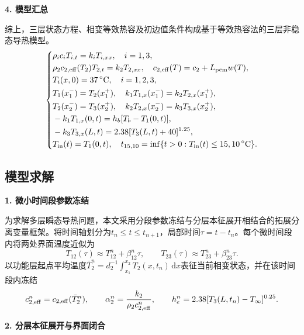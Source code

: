 \noindent\textbf{4. 模型汇总}\par
综上，三层状态方程、相变等效热容及初边值条件构成基于等效热容法的三层非稳态导热模型。
\vspace{-0.3\baselineskip}
{\boldmath
\begin{equation}
\left\{
\begin{aligned}
&\rho_i c_iT_{i,t}=k_iT_{i,xx},\quad i=1,3,\\
&\rho_2c_{2,\rm eff}(T_2)T_{2,t}=k_2T_{2,xx},\quad c_{2,\rm eff}(T)=c_2+L_{\rm pcm}w(T),\\
&T_i(x,0)=37\,^{\circ}\mathrm C,\quad i=1,2,3,\\
&T_1(x_1^-)=T_2(x_1^+),\quad k_1T_{1,x}(x_1^-)=k_2T_{2,x}(x_1^+),\\
&T_2(x_2^-)=T_3(x_2^+),\quad k_2T_{2,x}(x_2^-)=k_3T_{3,x}(x_2^+),\\
&-k_1T_{1,x}(0,t)=h_b[T_b-T_1(0,t)],\\
&-k_3T_{3,x}(L,t)=2.38[T_3(L,t)+40]^{1.25},\\
&T_{\rm in}(t)=T_1(0,t),\quad t_{15,10}=\inf\{t>0:T_{\rm in}(t)\le15,10\,^{\circ}\mathrm C\}.
\end{aligned}
\right.
\label{eq:q1-model-summary}
\end{equation}}

\subsection{模型求解}

\noindent\textbf{1. 微小时间段参数冻结}\par

为求解多层瞬态导热问题，本文采用分段参数冻结与分层本征展开相结合的拓展分离变量框架\cite{jain2024multilayer}。将时间轴划分为$t_n\le t\le t_{n+1}$，局部时间$\tau=t-t_n$。每个微时间段内将两处界面温度近似为
\begin{equation}
T_{12}(\tau)\approx T_{12}^n+\beta_{12}^n\tau,\qquad
T_{23}(\tau)\approx T_{23}^n+\beta_{23}^n\tau.
\label{eq:q1-interface-linear}
\end{equation}
以功能层起点平均温度$\bar T_2^n=d_2^{-1}\int_{x_1}^{x_2}T_2(x,t_n)\,\mathrm dx$表征当前相变状态，并在该时间段内冻结
\begin{equation}
c_{2,\rm eff}^n=c_{2,\rm eff}(\bar T_2^n),\qquad
\alpha_2^n=\frac{k_2}{\rho_2c_{2,\rm eff}^n},\qquad
h_e^n=2.38[T_3(L,t_n)-T_\infty]^{0.25}.
\label{eq:q1-ceff-freeze}
\end{equation}

\noindent\textbf{2. 分层本征展开与界面闭合}\par

